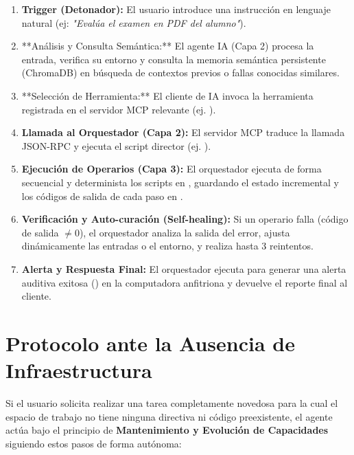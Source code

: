 \documentclass[12pt,a4paper]{article}
\begin{document}
\begin{figure}[h]
    \centering
\end{figure}

\begin{enumerate}
    \item \textbf{Trigger (Detonador):} El usuario introduce una instrucción en lenguaje natural (ej: \textit{"Evalúa el examen en PDF del alumno"}).
    \item **Análisis y Consulta Semántica:** El agente IA (Capa 2) procesa la entrada, verifica su entorno y consulta la memoria semántica persistente (ChromaDB) en búsqueda de contextos previos o fallas conocidas similares.
    \item **Selección de Herramienta:** El cliente de IA invoca la herramienta registrada en el servidor MCP relevante (ej. ).
    \item \textbf{Llamada al Orquestador (Capa 2):} El servidor MCP traduce la llamada JSON-RPC y ejecuta el script director (ej. ).
    \item \textbf{Ejecución de Operarios (Capa 3):} El orquestador ejecuta de forma secuencial y determinista los scripts en , guardando el estado incremental y los códigos de salida de cada paso en .
    \item \textbf{Verificación y Auto-curación (Self-healing):} Si un operario falla (código de salida $\ne 0$), el orquestador analiza la salida del error, ajusta dinámicamente las entradas o el entorno, y realiza hasta 3 reintentos.
    \item \textbf{Alerta y Respuesta Final:} El orquestador ejecuta  para generar una alerta auditiva exitosa () en la computadora anfitriona y devuelve el reporte final al cliente.
\end{enumerate}

\section{Protocolo ante la Ausencia de Infraestructura}

Si el usuario solicita realizar una tarea completamente novedosa para la cual el espacio de trabajo no tiene ninguna directiva ni código preexistente, el agente actúa bajo el principio de \textbf{Mantenimiento y Evolución de Capacidades} siguiendo estos pasos de forma autónoma:
\end{document}
